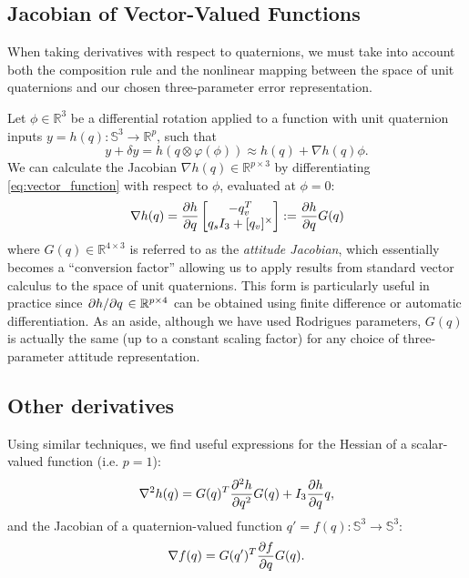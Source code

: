 \documentclass[letterpaper, 10 pt, conference]{ieeeconf}  %
\newcommand{\R}{\mathbb{R}}
\newcommand{\Q}{\mathbb{S}^3}
\newcommand{\skewmat}[1]{[#1]^\times}
\begin{document}
    \subsection{Jacobian of Vector-Valued Functions}
        When taking derivatives with respect to quaternions, we must take into account
        both the composition rule and the nonlinear mapping between the space of unit
        quaternions and our chosen three-parameter error representation.

        Let $\phi \in \R^3$ be a differential rotation applied to a function with
        unit quaternion inputs $y = h(q): \Q \to \R^p$, such that
        \begin{equation} \label{eq:vector_function}
            y + \delta y = h(q \otimes \varphi(\phi)) \approx h(q) +  \nabla h(q) \phi.
        \end{equation}
        We can calculate the Jacobian $\nabla h(q) \in \R^{p \times 3}$ by
        differentiating \eqref{eq:vector_function} with respect to $\phi$, evaluated at
        $\phi = 0$:
        \begin{equation} \label{eq:quat_gradient}
            \nabla h(q) = \pdv{h}{q} \begin{bmatrix} 
                            -q_v^T \\ 
                            q_s I_3 + \skewmat{q_v}
                        \end{bmatrix}
                        := \pdv{h}{q} G(q) 
        \end{equation}
        where $G(q) \in \R^{4 \times 3}$ is referred to as the \textit{attitude Jacobian}, which
        essentially becomes a ``conversion factor'' allowing us to apply results from
        standard vector calculus to the space of unit quaternions. This form is
        particularly useful in practice since $\pdv*{h}{q} \in \R^{p \times 4}$ can be
        obtained using finite difference or automatic differentiation.
        As an aside, although we have used Rodrigues parameters, $G(q)$ is actually the
        same (up to a constant scaling factor) for any choice of three-parameter attitude
        representation.

    \subsection{Other derivatives}
        Using similar techniques, we find useful expressions for the Hessian of a
        scalar-valued function (i.e. $p = 1$):
	    \begin{equation} \label{eq:quat_hessian}
            \nabla^2 h(q) = G(q)^T \pdv[2]{h}{q} G(q) + I_3 \pdv{h}{q}q,
        \end{equation}
        and the Jacobian of a quaternion-valued function $q' = f(q) : \Q \to \Q$:
        \begin{equation} \label{eq:quat_jacobian}
            \nabla f(q) = G(q')^T \pdv{f}{q} G(q).
        \end{equation}
\end{document}
